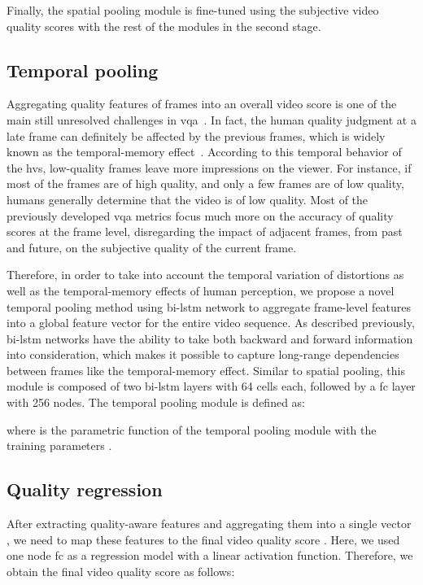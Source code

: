 \documentclass[journal]{IEEEtran}
\begin{document}
Finally, the spatial pooling module is fine-tuned using the subjective video quality scores with the rest of the modules in the second
stage.
\subsection{Temporal pooling}
Aggregating quality features of frames into an overall video score is one of the main still unresolved challenges in \ac{vqa}~\cite{seshadrinathan2011temporal,tu2020comparative,park2012video,li2021unified,korhonen2019two}. In fact, the human quality judgment at a late frame can definitely be affected by the previous frames, which is widely known as  the temporal-memory effect~\cite{park2012video,xu2014no,kim2018deep,ninassi2009considering}. According to this temporal behavior of the \ac{hvs}, low-quality frames leave more impressions on the viewer. For instance, if most of the frames are of high quality, and only a few frames are of low quality, humans generally determine that the video is of low quality. Most of the previously developed \ac{vqa} metrics focus much more on the accuracy of quality scores at the frame level, disregarding the impact of adjacent frames, from past and future, on the subjective quality of the current frame.

Therefore, in order to take into account the temporal variation of distortions  as well as the temporal-memory effects of human perception, we propose a novel temporal pooling method using \ac{bi-lstm} network to aggregate frame-level features  into a global feature vector  for the entire video sequence. As described previously, \ac{bi-lstm} networks have the ability to take both backward and forward information into consideration, which makes it possible to capture long-range dependencies between frames like the temporal-memory effect. Similar to spatial pooling, this module is composed of two \ac{bi-lstm} layers with 64 cells each, followed by a \ac{fc} layer with 256 nodes. The temporal pooling module is defined as: 

where  is the parametric function of the temporal pooling module with the training parameters .
\subsection{Quality regression}
After extracting quality-aware features and aggregating them into a single vector , we need to map these features to the final video quality score . Here, we used one node \ac{fc} as a regression model with a linear activation function. Therefore, we obtain the final video quality score as follows:
\end{document}
